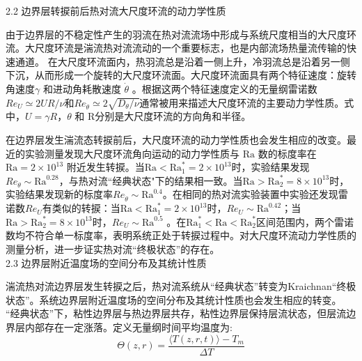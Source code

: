 \documentclass[10pt,aps]{article}
\def\be{\begin{equation}}
\def\ee{\end{equation}}
\def\Ra{\textrm{Ra}}
\begin{document}
{2.2 边界层转捩前后热对流大尺度环流的动力学性质 
\vskip 6pt


由于边界层的不稳定性产生的羽流在热对流流场中形成与系统尺度相当的大尺度环流。大尺度环流是湍流热对流流动的一个重要标志，也是内部流场热量流传输的快速通道。 在大尺度环流面内，热羽流总是沿着一侧上升，冷羽流总是沿着另一侧下沉，从而形成一个旋转的大尺度环流面。大尺度环流面具有两个特征速度：旋转角速度$\gamma$ \cite{QT01a}和进动角耗散速度 $\dot{\theta}$ \cite{BA06a}。根据这两个特征速度定义的无量纲雷诺数$Re_U \simeq 2UR/\nu$和$Re_{\dot{\theta}} \simeq 2\sqrt{D_\theta/\nu}$通常被用来描述大尺度环流的主要动力学性质。式中，$U = \gamma R$，${\theta}$ 和 R分别是大尺度环流的方向角和半径。
\vskip 6pt


在边界层发生湍流态转捩前后，大尺度环流的动力学性质也会发生相应的改变。最近的实验测量发现大尺度环流角向运动的动力学性质与 $\Ra$ 数的标度率在 $\Ra = 2 \times 10^{13}$ 附近发生转捩\cite{HBA16}。当$\Ra < \Ra_1^* = 2 \times 10^{13}$时，实验结果发现$Re_{\dot{\theta}} \sim \Ra^{0.28}$，与热对流``经典状态"下的结果相一致\cite{BA06a,BA06b}。当$\Ra > \Ra_2^* = 8 \times 10^{13}$时，实验结果发现新的标度率$Re_{\dot{\theta}} \sim \Ra^{0.4}$。在相同的热对流实验装置中实验还发现雷诺数$Re_U$有类似的转捩：当$\Ra < \Ra_1^* = 2 \times 10^{13}$时，$Re_U \sim \Ra^{0.42}$；当$\Ra > \Ra_2^* = 8 \times 10^{13}$时，$Re_U \sim \Ra^{0.5}$ \cite{HBA16}。在$\Ra_1^*<\Ra < \Ra_2^*$区间范围内，两个雷诺数均不符合单一标度率，表明系统正处于转捩过程中。对大尺度环流动力学性质的测量分析，进一步证实热对流“终极状态”的存在。\\




2.3 边界层附近温度场的空间分布及其统计性质
\vskip 6pt

湍流热对流边界层发生转捩之后，热对流系统从``经典状态''转变为Kraichnan``终极状态''。系统边界层附近温度场的空间分布及其统计性质也会发生相应的转变。
``经典状态''下，粘性边界层与热边界层共存，粘性边界层保持层流状态，但层流边界层内部存在一定涨落。定义无量纲时间平均温度为:
\be
\Theta(z,r)=\frac{\langle T(z,r,t)\rangle-T_m}{\Delta T}
\ee


}
\end{document}
